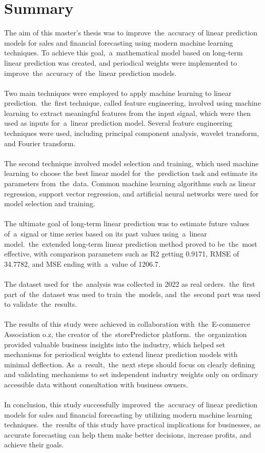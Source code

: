 
\chapter{Summary} \label{summary}
The aim of this master's thesis was to improve~the~accuracy of linear prediction models for sales
and financial forecasting using modern machine learning techniques. To achieve this goal,~a~mathematical
model based on long-term linear prediction was created, and periodical weights were implemented
to improve~the~accuracy of~the~linear prediction models.\\
\\
Two main techniques were employed to apply machine learning to linear prediction.~the~first technique,
called feature engineering, involved using machine learning to extract meaningful features from
the input signal, which were then used as inputs for~a~linear prediction model. Several feature
engineering techniques were used, including principal component analysis, wavelet transform, and
Fourier transform.\\
\\
The second technique involved model selection and training, which used machine learning to choose
the best linear model for~the~prediction task and estimate its parameters from~the~data. Common machine
learning algorithms such as linear regression, support vector regression, and artificial neural networks
were used for model selection and training.\\
\\
The ultimate goal of long-term linear prediction was to estimate future values of~a~signal or time
series based on its past values using~a~linear model.~the~extended long-term linear prediction method
proved to be~the~most effective, with comparison parameters such as R2 getting 0.9171, RMSE of 34.7782, and MSE ending
with~a~value of 1206.7.\\
\\
The dataset used for~the~analysis was collected in 2022 as real orders.~the~first part of~the~dataset
was used to train~the~models, and~the~second part was used to validate~the~results.\\
\\
The results of this study were achieved in collaboration with~the~E-commerce Association o.z,
the creator of~the~storePredictor platform.~the~organization provided valuable business insights into
the industry, which helped set mechanisms for periodical weights to extend linear prediction models
with minimal deflection. As~a~result,~the~next steps should focus on clearly defining and validating
mechanisms to set independent industry weights only on ordinary accessible data without consultation
with business owners.\\
\\
In conclusion, this study successfully improved~the~accuracy of linear prediction models for sales
and financial forecasting by utilizing modern machine learning techniques.~the~results of this study
have practical implications for businesses, as accurate forecasting can help them make better decisions,
increase profits, and achieve their goals.

